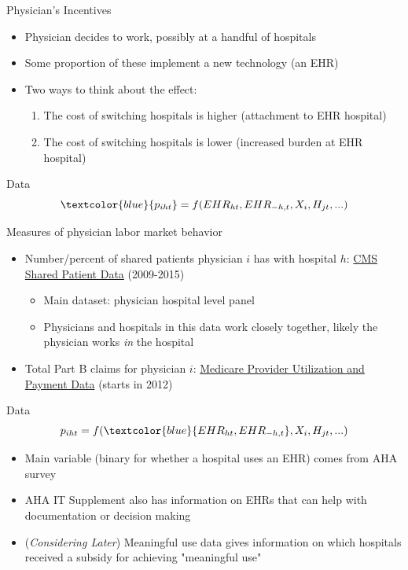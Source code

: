 \documentclass[10pt]{beamer}
\begin{document}
\begin{frame}{Physician's Incentives}
\begin{itemize}
    \item Physician decides to work, possibly at a handful of hospitals
    \item Some proportion of these implement a new technology (an EHR)
    \item Two ways to think about the effect:
    \begin{enumerate}
        \item The cost of switching hospitals is higher (attachment to EHR hospital)
        \item The cost of switching hospitals is lower (increased burden at EHR hospital)
    \end{enumerate}
\end{itemize}
\end{frame}


\begin{frame}{Data}
\begin{equation*}
    \textcolor{blue}{p_{iht}}=f(EHR_{ht},EHR_{-h,t},X_i,H_{jt},...)
\end{equation*}

\vspace{3mm}

Measures of physician labor market behavior
\begin{itemize}
    \item Number/percent of shared patients physician $i$ has with hospital $h$: \underline{CMS Shared Patient Data} (2009-2015)
    \begin{itemize}
        \item Main dataset: physician hospital level panel
        \item Physicians and hospitals in this data work closely together, likely the physician works \textit{in} the hospital
    \end{itemize}
    \item Total Part B claims for physician $i$: \underline{Medicare Provider Utilization and Payment Data} (starts in 2012)
\end{itemize}
\end{frame}

\begin{frame}{Data}
\begin{equation*}
    p_{iht}=f(\textcolor{blue}{EHR_{ht},EHR_{-h,t}},X_i,H_{jt},...)
\end{equation*}

\vspace{5mm}

\begin{itemize}
    \item Main variable (binary for whether a hospital uses an EHR) comes from AHA survey
    \item AHA IT Supplement also has information on EHRs that can help with documentation or decision making
    \item (\textit{Considering Later}) Meaningful use data gives information on which hospitals received a subsidy for achieving "meaningful use"
\end{itemize}
\end{frame}
\end{document}
